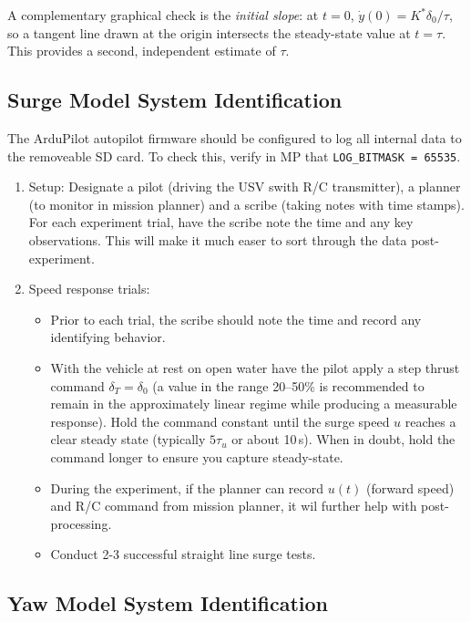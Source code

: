 \documentclass[11pt]{article}
\begin{document}
A complementary graphical check is the \emph{initial slope}: at $t=0$,
$\dot{y}(0) = K^*\delta_0/\tau$, so a tangent line drawn at the origin
intersects the steady-state value at $t = \tau$.  This provides a
second, independent estimate of $\tau$.

\subsection{Surge Model System Identification}

The ArduPilot autopilot firmware should be configured to log all internal data to the removeable SD card.  To check this, verify in MP that \texttt{LOG\_BITMASK = 65535}.

\begin{enumerate}
  \item Setup: Designate a pilot (driving the USV swith R/C transmitter), a planner (to monitor in mission planner) and a scribe (taking notes with time stamps).  For each experiment trial, have the scribe note the time and any key observations.  This will make it much easer to sort through the data post-experiment. 
  \item Speed response trials: 
  \begin{itemize}
    \item Prior to each trial, the scribe should note the time and record any identifying behavior.
    \item With the vehicle at rest on open water have the pilot apply a step
        thrust command $\delta_T = \delta_0$ (a value in the range 20--50\%
        is recommended to remain in the approximately linear regime while
        producing a measurable response).  Hold the command constant until
        the surge speed $u$ reaches a clear steady state (typically
        $5\tau_u$ or about 10\,s).  When in doubt, hold the command longer to ensure you capture steady-state.
      \item During the experiment, if the planner can record 
        $u(t)$ (forward speed) and R/C command from mission planner, it wil further help with post-processing.
      \item Conduct 2-3 successful straight line surge tests.
  \end{itemize}

\end{enumerate}


\subsection{Yaw Model System Identification}
\end{document}

